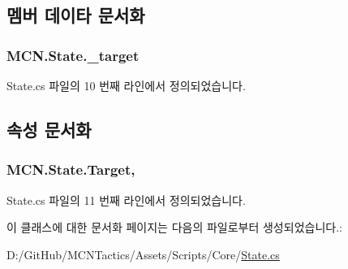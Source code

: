 \subsection{멤버 데이타 문서화}
\subsubsection[{\texorpdfstring{\+\_\+target}{_target}}]{ M\+C\+N.\+State.\+\_\+target\hspace{0.3cm}{\ttfamily [private]}}\hypertarget{class_m_c_n_1_1_state_a13fe398868da354cfde9ff644e12e9f2}{}\label{class_m_c_n_1_1_state_a13fe398868da354cfde9ff644e12e9f2}


State.\+cs 파일의 10 번째 라인에서 정의되었습니다.



\subsection{속성 문서화}
\subsubsection[{\texorpdfstring{Target}{Target}}]{ M\+C\+N.\+State.\+Target\hspace{0.3cm}{\ttfamily [get]}, {\ttfamily [protected]}}\hypertarget{class_m_c_n_1_1_state_a79a563b32f183c9adc9a96679fc57eb8}{}\label{class_m_c_n_1_1_state_a79a563b32f183c9adc9a96679fc57eb8}


State.\+cs 파일의 11 번째 라인에서 정의되었습니다.



이 클래스에 대한 문서화 페이지는 다음의 파일로부터 생성되었습니다.\+:\begin{DoxyCompactItemize}
\item 
D\+:/\+Git\+Hub/\+M\+C\+N\+Tactics/\+Assets/\+Scripts/\+Core/\hyperlink{_state_8cs}{State.\+cs}\end{DoxyCompactItemize}
